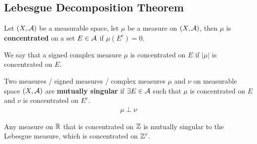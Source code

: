 \documentclass[11pt]{article}
\begin{document}
	\subsection{Lebesgue Decomposition Theorem}
	\begin{definition}
		Let $(X, \mathcal{{A}})$ be a measurable space, let $\mu$ be a measure on $(X, \mathcal{{A}})$, then $\mu$ is \textbf{concentrated} on a set $E \in \mathcal{{A}}$ if $\mu(E^c) = 0$.
		
		We say that a signed complex measure $\mu$ is concentrated on $E$ if $|\mu|$ is concentrated on $E$.
	\end{definition}
	
	\begin{definition}
		Two measures / signed measures / complex measures $\mu$ and $\nu$ on measurable space $(X, \mathcal{{A}})$ are \textbf{mutually singular} if $\exists E \in \mathcal{{A}}$ such that $\mu$ is concentrated on $E$ and $\nu$ is concentrated on $E^c$.
		\begin{align}
			\mu \perp \nu
		\end{align}
	\end{definition}
	
	\begin{example}
		Any measure on $\mathbb{R}$ that is concentrated on $\mathbb{Z}$ is mutually singular to the Lebesgue measure, which is concentrated on $\mathbb{Z}^c$.
	\end{example}
	
\end{document}

